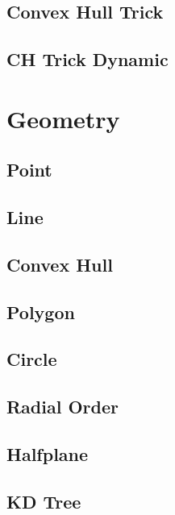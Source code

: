 \subsection{Convex Hull Trick}
\raggedbottom
\hrulefill
\subsection{CH Trick Dynamic}
\raggedbottom
\hrulefill

\section{Geometry}
\subsection{Point}
\raggedbottom
\hrulefill
\subsection{Line}
\raggedbottom
\hrulefill
\subsection{Convex Hull}
\raggedbottom
\hrulefill
\subsection{Polygon}
\raggedbottom
\hrulefill
\subsection{Circle}
\raggedbottom
\hrulefill
\subsection{Radial Order}
\raggedbottom
\hrulefill
\subsection{Halfplane}
\raggedbottom
\hrulefill
\subsection{KD Tree}
\raggedbottom
\hrulefill
